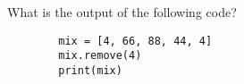 \documentclass{exam}
\begin{document}
\begin{questions}
   \question What is the output of the following code?

    \begin{verbatim}
        mix = [4, 66, 88, 44, 4]
        mix.remove(4)
        print(mix)
    \end{verbatim}
    \begin{oneparchoices}
        \choice [4, 66, 88, 44, 4]
        \choice [4, 66, 88, 44]
        \choice [66, 88, 44, 4]
        \choice [66, 88, 44]
    \end{oneparchoices}


\end{questions}
\end{document}
